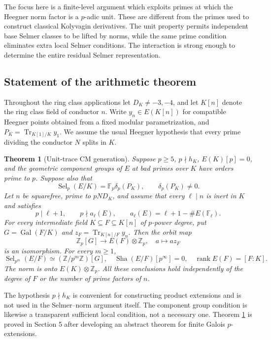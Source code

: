 \documentclass[11pt,a4paper]{article}
\newtheorem{theorem}{Theorem}[section]\newtheorem{proposition}[theorem]{Proposition}\newtheorem{lemma}[theorem]{Lemma}\newtheorem{corollary}[theorem]{Corollary}\theoremstyle{definition}\newtheorem{definition}[theorem]{Definition}\theoremstyle{remark}\newtheorem{remark}[theorem]{Remark}
\newcommand{\Zp}{\mathbb Z_p}\newcommand{\Qp}{\mathbb Q_p}\newcommand{\Fp}{\mathbb F_p}\newcommand{\Q}{\mathbb Q}\newcommand{\Sha}{\operatorname{Sha}}\newcommand{\Sel}{\operatorname{Sel}}\newcommand{\Gal}{\operatorname{Gal}}\newcommand{\Tr}{\operatorname{Tr}}\newcommand{\rk}{\operatorname{rank}}\newcommand{\ord}{\operatorname{ord}}\newcommand{\Hom}{\operatorname{Hom}}\newcommand{\SL}{\operatorname{SL}}\newcommand{\GL}{\operatorname{GL}}\newcommand{\coker}{\operatorname{coker}}\newcommand{\length}{\operatorname{length}}\newcommand{\res}{\operatorname{res}}\newcommand{\cor}{\operatorname{cor}}\newcommand{\Id}{\operatorname{id}}
\numberwithin{equation}{section}
\begin{document}
The focus here is a finite-level argument which exploits primes at which the Heegner norm factor is a $p$-adic unit. These are different from the primes used to construct classical Kolyvagin derivatives. The unit property permits independent base Selmer classes to be lifted by norms, while the same prime condition eliminates extra local Selmer conditions. The interaction is strong enough to determine the entire residual Selmer representation.
\subsection{Statement of the arithmetic theorem}
Throughout the ring class applications let $D_K\ne-3,-4$, and let $K[n]$ denote the ring class field of conductor $n$. Write $y_n\in E(K[n])$ for compatible Heegner points obtained from a fixed modular parametrization, and $P_K=\Tr_{K[1]/K}y_1$. We assume the usual Heegner hypothesis that every prime dividing the conductor $N$ splits in $K$.
\begin{theorem}[Unit-trace CM generation]\label{main}
Suppose $p\ge5$, $p\nmid h_K$, $E(K)[p]=0$, and the geometric component groups of $E$ at bad primes over $K$ have orders prime to $p$. Suppose also that
\begin{equation}\label{base}
\Sel_p(E/K)=\Fp\delta_p(P_K),\qquad \delta_p(P_K)\ne0.
\end{equation}
Let $n$ be squarefree, prime to $pND_K$, and assume that every $\ell\mid n$ is inert in $K$ and satisfies
\begin{equation}\label{unit}
p\mid\ell+1,\qquad p\nmid a_\ell(E),\qquad a_\ell(E)=\ell+1-\#E(\mathbb F_\ell).
\end{equation}
For every intermediate field $K\subseteq F\subseteq K[n]$ of $p$-power degree, put $G=\Gal(F/K)$ and $z_F=\Tr_{K[n]/F}y_n$. Then the orbit map
\begin{equation}\label{mainiso}
\Zp[G]\longrightarrow E(F)\otimes\Zp,\quad a\longmapsto az_F
\end{equation}
is an isomorphism. For every $m\ge1$,
\begin{equation}\label{mainresults}
\Sel_{p^m}(E/F)\simeq(\mathbb Z/p^m\mathbb Z)[G],\quad
\Sha(E/F)[p^\infty]=0,\quad \rk E(F)=[F:K].
\end{equation}
The norm is onto $E(K)\otimes\Zp$. All these conclusions hold independently of the degree of $F$ or the number of prime factors of $n$.
\end{theorem}
The hypothesis $p\nmid h_K$ is convenient for constructing product extensions and is not used in the Selmer--norm argument itself. The component group condition is likewise a transparent sufficient local condition, not a necessary one. Theorem \ref{main} is proved in Section 5 after developing an abstract theorem for finite Galois $p$-extensions.
\end{document}
